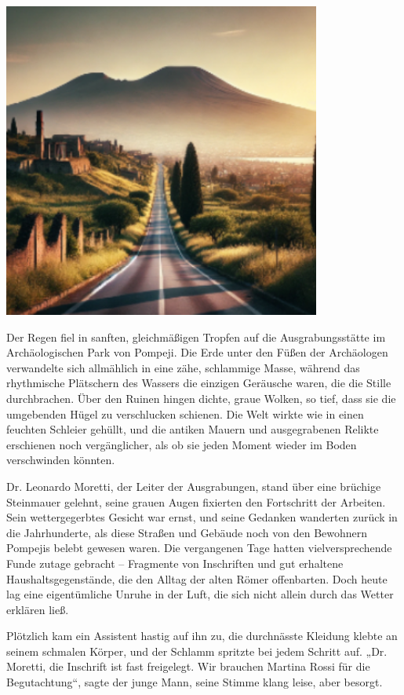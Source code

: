 \documentclass[
]{article}
\begin{document}
\includegraphics[width=4.11458in,height=4.09375in]{media/image2.png}

Der Regen fiel in sanften, gleichmäßigen Tropfen auf die
Ausgrabungsstätte im Archäologischen Park von Pompeji. Die Erde unter
den Füßen der Archäologen verwandelte sich allmählich in eine zähe,
schlammige Masse, während das rhythmische Plätschern des Wassers die
einzigen Geräusche waren, die die Stille durchbrachen. Über den Ruinen
hingen dichte, graue Wolken, so tief, dass sie die umgebenden Hügel zu
verschlucken schienen. Die Welt wirkte wie in einen feuchten Schleier
gehüllt, und die antiken Mauern und ausgegrabenen Relikte erschienen
noch vergänglicher, als ob sie jeden Moment wieder im Boden verschwinden
könnten.

Dr. Leonardo Moretti, der Leiter der Ausgrabungen, stand über eine
brüchige Steinmauer gelehnt, seine grauen Augen fixierten den
Fortschritt der Arbeiten. Sein wettergegerbtes Gesicht war ernst, und
seine Gedanken wanderten zurück in die Jahrhunderte, als diese Straßen
und Gebäude noch von den Bewohnern Pompejis belebt gewesen waren. Die
vergangenen Tage hatten vielversprechende Funde zutage gebracht --
Fragmente von Inschriften und gut erhaltene Haushaltsgegenstände, die
den Alltag der alten Römer offenbarten. Doch heute lag eine
eigentümliche Unruhe in der Luft, die sich nicht allein durch das Wetter
erklären ließ.

Plötzlich kam ein Assistent hastig auf ihn zu, die durchnässte Kleidung
klebte an seinem schmalen Körper, und der Schlamm spritzte bei jedem
Schritt auf. „Dr. Moretti, die Inschrift ist fast freigelegt. Wir
brauchen Martina Rossi für die Begutachtung``, sagte der junge Mann,
seine Stimme klang leise, aber besorgt.
\end{document}

